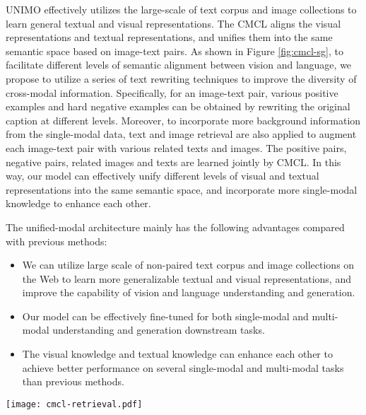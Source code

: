 \documentclass[11pt,a4paper]{article}
\begin{document}
UNIMO effectively utilizes the large-scale of text corpus and image collections to learn general textual and visual representations. 
The CMCL aligns the visual representations and textual representations, and unifies them into the same semantic space based on image-text pairs.
As shown in Figure \ref{fig:cmcl-sg}, to facilitate different levels of semantic alignment between vision and language, we propose to utilize a series of text rewriting techniques to improve the diversity of cross-modal information.
Specifically, for an image-text pair, various positive examples and hard negative examples can be obtained by rewriting the original caption at different levels.
Moreover, to incorporate more background information from the single-modal data, text and image retrieval are also applied to augment each image-text pair with various related texts and images.
The positive pairs, negative pairs, related images and texts are learned jointly by CMCL.
In this way, our model can effectively unify different levels of visual and textual representations into the same semantic space, and incorporate more single-modal knowledge to enhance each other.

The unified-modal architecture mainly has the following advantages compared with previous methods:
\begin{itemize}
\item We can utilize large scale of non-paired text corpus and image collections on the Web to learn more generalizable textual and visual representations, and improve the capability of vision and language understanding and generation.
\item Our model can be effectively fine-tuned for both single-modal and multi-modal understanding and generation downstream tasks.
\item The visual knowledge and textual knowledge can enhance each other to achieve better performance on several single-modal and multi-modal tasks than previous methods.
\end{itemize}









\begin{figure*}[t!]
	\centering
	\texttt{[image: cmcl-retrieval.pdf]}
	\caption{Illustration of the CMCL. A series of text rewriting techniques are utilized to create positive image-text pairs $\mathcal{X^+}$ and hard negative image-text pairs $\mathcal{X^-}$. Image and text retrieval are also utilized to obtain related images $\mathcal{X^I}$ and texts $\mathcal{X^T}$ from single-modal data, which are treated as single-modal positive samples during cross-modal learning. All of them are encoded by the same unified-modal Transformer in pairs or individually, and the representations of images and texts are extracted to compute the contrastive loss.}
	\label{fig:cmcl-sg}
\end{figure*}
\end{document}
